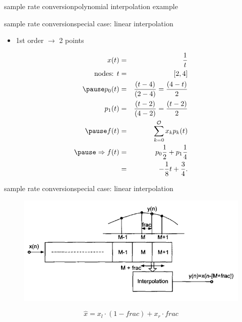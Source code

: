 	\begin{frame}{sample rate conversion}{polynomial interpolation example}
    \end{frame}
	\begin{frame}{sample rate conversion}{special case: linear interpolation}
        \begin{itemize}
            \item   1st order $\rightarrow$ 2 points
        \end{itemize}
        \begin{footnotesize}
        \begin{eqnarray*}
            x(t) &=& \frac{1}{t}\\
            \text{nodes: } t &=& [2, 4]\\
            \pause
            p_0(t) &=& \frac{(t-4)}{(2-4)} = \frac{(4-t)}{2}\\
            p_1(t) &=& \frac{(t-2)}{(4-2)} = \frac{(t-2)}{2}\\
            \pause
             f(t) &=& \sum\limits_{k=0}^\mathcal{O}x_k p_k(t)\\
            \pause
            \Rightarrow f(t) &=& p_0\frac{1}{2}+p_1\frac{1}{4}\\
            &=& - \frac{1}{8}t + \frac{3}{4}.
        \end{eqnarray*}
         \end{footnotesize}
    \end{frame}
	\begin{frame}{sample rate conversion}{special case: linear interpolation}
        \begin{figure}
            \begin{center}
                \includegraphics[scale=0.4]{Graph/src_lininterpol}
            \end{center}
        \end{figure}
        
        \begin{equation*}
            \hat{x} = x_l\cdot (1-frac) + x_r\cdot frac
        \end{equation*}
    \end{frame}
